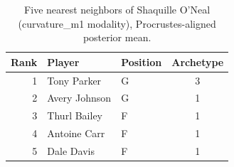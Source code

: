 \begin{table}[htbp]
  \centering\small
  \begin{tabular}{rllc}
    \toprule
    Rank & Player & Position & Archetype \\
    \midrule
    1 & Tony Parker & G & 3 \\
    2 & Avery Johnson & G & 1 \\
    3 & Thurl Bailey & F & 1 \\
    4 & Antoine Carr & F & 1 \\
    5 & Dale Davis & F & 1 \\
    \bottomrule
  \end{tabular}
  \caption{Five nearest neighbors of Shaquille O'Neal (curvature_m1 modality), Procrustes-aligned posterior mean.}
  \label{tab:Shaquille_O_Neal_neighbors_curvature_m1}
\end{table}

